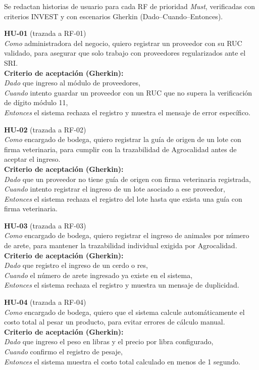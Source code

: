 \documentclass[11pt,a4paper]{article}
\begin{document}
Se redactan historias de usuario para cada RF de prioridad \textit{Must}, verificadas con criterios INVEST y con escenarios Gherkin (Dado--Cuando--Entonces).

\newcommand{\huitem}[4]{%
\noindent\textbf{#1} (trazada a #2)\\
\textit{Como} #3\\[0.15cm]
\textbf{Criterio de aceptación (Gherkin):}\\
#4
\vspace{0.3cm}
}

\huitem{HU-01}{RF-01}{administradora del negocio, quiero registrar un proveedor con su RUC validado, para asegurar que solo trabajo con proveedores regularizados ante el SRI.}{
\textit{Dado} que ingreso al módulo de proveedores,\\
\textit{Cuando} intento guardar un proveedor con un RUC que no supera la verificación de dígito módulo 11,\\
\textit{Entonces} el sistema rechaza el registro y muestra el mensaje de error específico.}

\huitem{HU-02}{RF-02}{encargado de bodega, quiero registrar la guía de origen de un lote con firma veterinaria, para cumplir con la trazabilidad de Agrocalidad antes de aceptar el ingreso.}{
\textit{Dado} que un proveedor no tiene guía de origen con firma veterinaria registrada,\\
\textit{Cuando} intento registrar el ingreso de un lote asociado a ese proveedor,\\
\textit{Entonces} el sistema rechaza el registro del lote hasta que exista una guía con firma veterinaria.}

\huitem{HU-03}{RF-03}{encargado de bodega, quiero registrar el ingreso de animales por número de arete, para mantener la trazabilidad individual exigida por Agrocalidad.}{
\textit{Dado} que registro el ingreso de un cerdo o res,\\
\textit{Cuando} el número de arete ingresado ya existe en el sistema,\\
\textit{Entonces} el sistema rechaza el registro y muestra un mensaje de duplicidad.}

\huitem{HU-04}{RF-04}{encargado de bodega, quiero que el sistema calcule automáticamente el costo total al pesar un producto, para evitar errores de cálculo manual.}{
\textit{Dado} que ingreso el peso en libras y el precio por libra configurado,\\
\textit{Cuando} confirmo el registro de pesaje,\\
\textit{Entonces} el sistema muestra el costo total calculado en menos de 1 segundo.}
\end{document}

